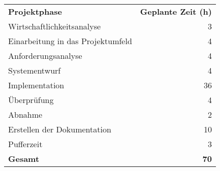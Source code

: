 \begin{tabular}{lr}
\rowcolor{KVGruen}\textbf{Projektphase} & \textbf{Geplante Zeit (h)} \\
Wirtschaftlichkeitsanalyse & 3 \\
\rowcolor{KVGrau}Einarbeitung in das Projektumfeld & 4 \\
Anforderungsanalyse & 4 \\
\rowcolor{KVGrau}Systementwurf & 4 \\
Implementation & 36 \\
\rowcolor{KVGrau}Überprüfung & 4 \\
Abnahme & 2 \\
\rowcolor{KVGrau}Erstellen der Dokumentation & 10 \\
Pufferzeit & 3 \\
\hline
\hline
\rowcolor{KVGrau}\textbf{Gesamt} & \textbf{70} \\
\end{tabular}
